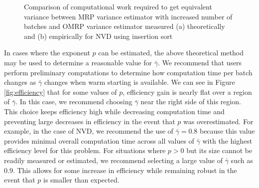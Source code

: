 \documentclass[12pt]{article}
\newcommand{\gammab}{\bar{\gamma}}
\begin{document}
\begin{figure}[htb!]
	\centering
		\caption{
		Comparison of computational work required to get equivalent variance between MRP variance estimator with increased number of batches and OMRP variance estimator measured
		(a) theoretically and 
		(b) empirically for NVD using insertion sort
		}
\label{fig:comp_work_comparison}
\end{figure}


In cases where the exponent $p$ can be estimated, the above theoretical method may be used to determine a reasonable value for $\gammab$.
We recommend that users perform preliminary computations to determine how computation time per batch changes as $\gammab$ changes when warm starting is available. 
We can see in Figure \ref{fig:efficiency} that for some values of $p$, efficiency gain is nearly flat over a region of $\gammab$.
In this case, we recommend choosing $\gammab$ near the right side of this region.
This choice keeps efficiency high while decreasing computation time and preventing large decreases in efficiency in the event that $p$ was overestimated.
For example, in the case of NVD, we recommend the use of $\gammab=0.8$ 
because this value provides minimal overall computation time across all values of $\gammab$ with the highest efficiency level for this problem.  
For situations where $p > 0$ but its size cannot be readily measured or estimated, we recommend selecting a large value of $\gammab$ such as $0.9$.
This allows for some increase in efficiency while remaining robust in the event that $p$ is smaller than expected.
\end{document}
